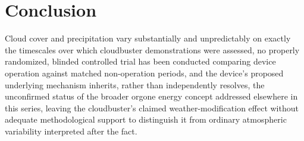 \documentclass[11pt]{article}
\begin{document}
\section{Conclusion}

Cloud cover and precipitation vary substantially and unpredictably on exactly the timescales over which cloudbuster demonstrations were assessed, no properly randomized, blinded controlled trial has been conducted comparing device operation against matched non-operation periods, and the device's proposed underlying mechanism inherits, rather than independently resolves, the unconfirmed status of the broader orgone energy concept addressed elsewhere in this series, leaving the cloudbuster's claimed weather-modification effect without adequate methodological support to distinguish it from ordinary atmospheric variability interpreted after the fact.
\end{document}
